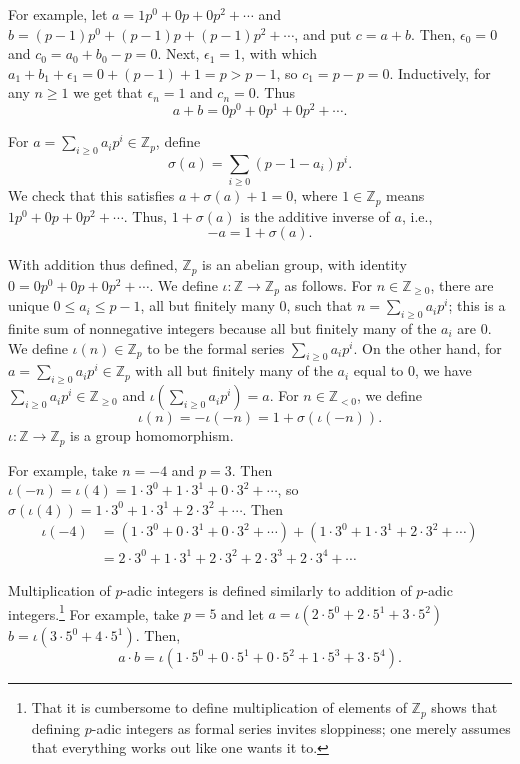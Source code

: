 \documentclass{article}
\theoremstyle{definition}
\begin{document}
For example, let $a=1p^0+0p+0p^2+\cdots$ and $b=(p-1)p^0+(p-1)p+(p-1)p^2+\cdots$, and put $c=a+b$.
Then, $\epsilon_0=0$ and $c_0=a_0+b_0-p=0$. Next, $\epsilon_1=1$, with which 
$a_1+b_1+\epsilon_1=0+(p-1)+1=p>p-1$, so $c_1=p-p=0$. Inductively,
for any $n \geq 1$ we get that $\epsilon_n=1$ and $c_n=0$. Thus
\[
a+b=0p^0+0p^1+0p^2+\cdots.
\]

For $a=\sum_{i \geq 0} a_ip^i \in \mathbb{Z}_p$, define
\[
\sigma(a) = \sum_{i \geq 0} (p-1-a_i) p^i.
\]
We check that this satisfies $a+\sigma(a)+1=0$, where $1 \in \mathbb{Z}_p$ means $1 p^0+0 p+0 p^2+\cdots$. Thus, $1+\sigma(a)$ is the additive inverse of $a$, i.e.,
\[
-a=1+\sigma(a).
\]

With addition thus defined, $\mathbb{Z}_p$ is an abelian group, with identity $0=0p^0+0p+0p^2+\cdots$.
We define $\iota:\mathbb{Z} \to \mathbb{Z}_p$ as follows. 
For 
$n \in \mathbb{Z}_{\geq 0}$, there are unique $0 \leq a_i \leq p-1$, all but finitely many $0$, such that 
$n = \sum_{i \geq 0} a_i p^i$; this is a finite sum of nonnegative integers because all but finitely many of the $a_i$ are 0.
We define $\iota(n) \in \mathbb{Z}_p$ to be the formal series  $\sum_{i \geq 0} a_i p^i$. 
On the other
hand, for $a = \sum_{i \geq 0} a_i p^i \in \mathbb{Z}_p$ with all but finitely many of the $a_i$ equal to $0$, 
we have $ \sum_{i \geq 0} a_i p^i  \in \mathbb{Z}_{\geq 0}$ and $\iota( \sum_{i \geq 0} a_i p^i ) = a$. 
For $n \in \mathbb{Z}_{<0}$, we define
\[
\iota(n) =  -\iota(-n) = 1+\sigma(\iota(-n)).
\]
$\iota:\mathbb{Z} \to \mathbb{Z}_p$ is a group homomorphism.

For example, take $n=-4$ and $p=3$. Then $\iota(-n)=\iota(4)=1 \cdot 3^0+1 \cdot 3^1 + 0 \cdot 3^2 + \cdots$, so
$\sigma(\iota(4))=1 \cdot 3^0+1 \cdot 3^1+2\cdot 3^2+\cdots$. Then
\begin{align*}
\iota(-4)&=(1\cdot 3^0+0\cdot 3^1+0\cdot 3^2+\cdots)+(1\cdot 3^0+1\cdot 3^1+2\cdot 3^2+\cdots)\\
&=2\cdot 3^0+1\cdot 3^1+2\cdot 3^2+2\cdot 3^3+2\cdot 3^4+\cdots
\end{align*}

Multiplication of $p$-adic integers is defined similarly to addition of $p$-adic integers.\footnote{That it is cumbersome to
define multiplication of elements of $\mathbb{Z}_p$ shows that defining $p$-adic integers as formal series invites sloppiness;
one merely assumes that everything works out like one wants it to.}
For example, take $p=5$ and let $a=\iota(2\cdot 5^0+2\cdot 5^1+3\cdot 5^2)$
$b=\iota(3\cdot 5^0+4\cdot 5^1)$. Then,
\[
a\cdot b=\iota(1\cdot 5^0+0\cdot 5^1+0\cdot 5^2+1\cdot 5^3+3\cdot 5^4).
\]
\end{document}
